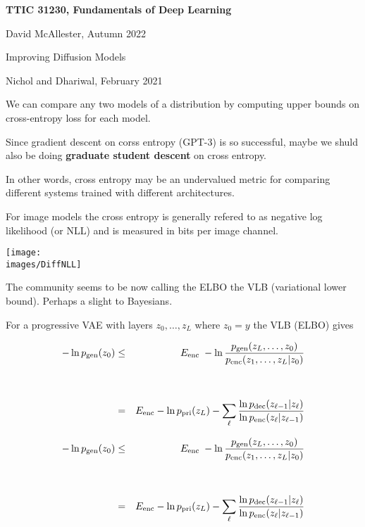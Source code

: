 





{\Huge

  \centerline{\bf TTIC 31230, Fundamentals of Deep Learning}
  \bigskip
  \centerline{David McAllester, Autumn 2022}
  \vfill
  \vfil
  \centerline{Improving Diffusion Models}
  \vfill
  \vfill

{Nichol and Dhariwal, February 2021}

We can compare any two models of a distribution by computing upper bounds on cross-entropy loss for each model.

\vfill
Since gradient descent on corss entropy (GPT-3) is so successful, maybe we shuld also be doing {\bf graduate student descent} on cross entropy.

\vfill
In other words, cross entropy may be an undervalued metric for comparing different systems trained with different architectures.



For image models the cross entropy is generally refered to as negative log likelihood (or NLL) and is measured in bits per image channel.

\centerline{\texttt{[image: \\images/DiffNLL]}}


The community seems to be now calling the ELBO the VLB (variational lower bound).  Perhaps a slight to Bayesians.

\vfill
For a progressive VAE with layers $z_0,\ldots,z_L$ where $z_0 = y$ the VLB (ELBO) gives

{\huge
\begin{eqnarray*}
- \ln p_{\mathrm{gen}}(z_0) & \leq & E_{\mathrm{enc}}\; -\ln \frac{p_{\mathrm{gen}}(z_L,\ldots,z_0)}{p_{\mathrm{enc}}(z_1,\ldots,z_L|z_0)}
\\
\\
\\
& = & E_{\mathrm{enc}} -\ln p_{\mathrm{pri}}(z_L) - \sum_{\ell } \frac{\ln p_{\mathrm{dec}}(z_{\ell-1}|z_\ell)}{\ln p_{\mathrm{enc}}(z_\ell|z_{\ell-1})}
\end{eqnarray*}
}


{\huge
\begin{eqnarray*}
- \ln p_{\mathrm{gen}}(z_0) & \leq & E_{\mathrm{enc}}\; -\ln \frac{p_{\mathrm{gen}}(z_L,\ldots,z_0)}{p_{\mathrm{enc}}(z_1,\ldots,z_L|z_0)}
\\
\\
\\
& = & E_{\mathrm{enc}} -\ln p_{\mathrm{pri}}(z_L) - \sum_{\ell } \frac{\ln p_{\mathrm{dec}}(z_{\ell-1}|z_\ell)}{\ln p_{\mathrm{enc}}(z_\ell|z_{\ell-1})}
\end{eqnarray*}
}

}
